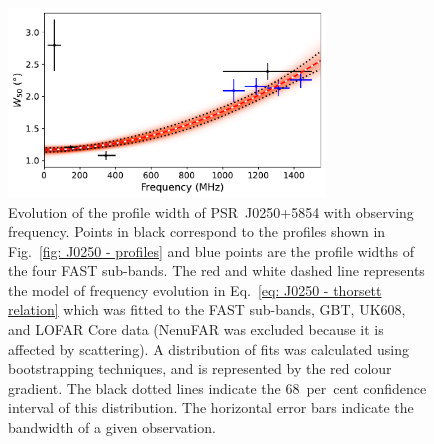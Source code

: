 \begin{figure}
    \begin{center}
        \includegraphics[width=0.75\textwidth]{Figures/J0250/thorsett_relation}
        \caption[Broadening of the profile with increasing frequency]{Evolution of the profile width of PSR~J0250+5854 with observing frequency. Points in black correspond to the profiles shown in Fig.~\ref{fig: J0250 - profiles} and blue points are the profile widths of the four FAST sub-bands. The red and white dashed line represents the model of frequency evolution in Eq.~\eqref{eq: J0250 - thorsett relation} which was fitted to the FAST sub-bands, GBT, UK608, and LOFAR Core data (NenuFAR was excluded because it is affected by scattering). A distribution of fits was calculated using bootstrapping techniques, and is represented by the red colour gradient. The black dotted lines indicate the 68~per~cent confidence interval of this distribution. The horizontal error bars indicate the bandwidth of a given observation.}
        \label{fig: J0250 - width evolution}
    \end{center}
\end{figure}

